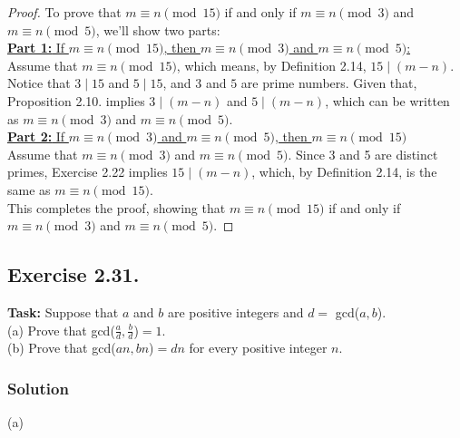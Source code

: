 \documentclass{article}
\begin{document}
\begin{proof}
   To prove that $m \equiv n \pmod{15}$ if and only if $m \equiv n \pmod{3}$ and $m \equiv n \pmod{5}$, we'll show two parts:\\

   \underline{\textbf{Part 1:} If $m \equiv n \pmod{15}$, then $m \equiv n \pmod{3}$ and $m \equiv n \pmod{5}$:}\\
   Assume that $m \equiv n \pmod{15}$, which means, by Definition 2.14, $15\mid (m-n)$.\\
   Notice that $3 \mid 15$ and $5\mid 15$, and $3$ and $5$ are prime numbers. Given that, Proposition 2.10. implies $3\mid (m-n)$ and $5 \mid (m-n)$, which can be written as $m \equiv n \pmod{3}$ and $m \equiv n \pmod{5}$.\\

   \underline{\textbf{Part 2:} If $m \equiv n \pmod{3}$ and $m \equiv n \pmod{5}$, then $m \equiv n \pmod{15}$}\\
   Assume that $m \equiv n \pmod{3}$ and $m \equiv n \pmod{5}$. Since 3 and 5 are distinct primes, Exercise 2.22 implies $15 \mid (m-n)$, which, by Definition 2.14, is the same as $m \equiv n \pmod{15}$.\\

   This completes the proof, showing that $m \equiv n \pmod{15}$ if and only if $m \equiv n \pmod{3}$ and $m \equiv n \pmod{5}$.
\end{proof}

\newpage

\subsection{Exercise 2.31.}
\textbf{Task:} Suppose that $a$ and $b$ are positive integers and $d=$ gcd($a,b$).\\
(a) Prove that gcd($\frac{a}{d},\frac{b}{d}$)$=1$.\\
(b) Prove that gcd($an,bn$)$=dn$ for every positive integer $n$.

\subsubsection*{Solution}

(a)
\end{document}
